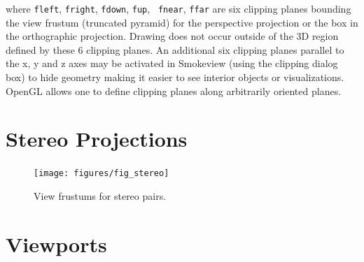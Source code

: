 \documentclass[11pt,twoside]{book}
\begin{document}
where {\tt fleft}, {\tt fright}, {\tt fdown}, {\tt fup}, {\tt
fnear}, {\tt ffar} are six clipping planes bounding the view
frustum (truncated pyramid) for the perspective projection or the
box in the orthographic projection.  Drawing does not occur
outside of the 3D region defined by these 6 clipping planes. An
additional six clipping planes parallel to the x, y and z axes may
be activated in Smokeview (using the clipping dialog box) to hide
geometry making it easier to see interior objects or
visualizations.  OpenGL allows one to define clipping planes along
arbitrarily oriented planes.

\section{Stereo Projections}

\begin{figure}[t]
\begin{center}
\texttt{[image: figures/fig\_stereo]}
\end{center}
\caption{View frustums for stereo pairs.}
 \label{figstereo}
\end{figure}

\section{Viewports}
\end{document}
